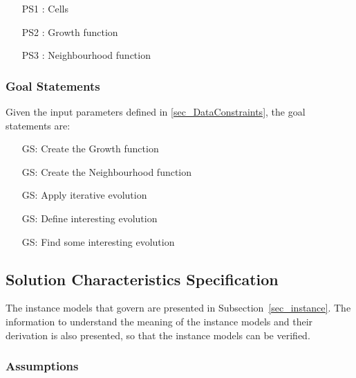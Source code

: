 \documentclass[12pt]{article}
\newcounter{goalnum} %
\begin{document}
\begin{itemize}

\item[PS1 :] Cells

\item[PS2 :] Growth function

\item[PS3 :] Neighbourhood function

\end{itemize}

\subsubsection{Goal Statements}

\noindent Given the input parameters defined in \ref{sec_DataConstraints}, the goal statements are:

\begin{itemize}

\item[GS\refstepcounter{goalnum}\thegoalnum \label{G_GFCT}:] Create the Growth function

\item[GS\refstepcounter{goalnum}\thegoalnum \label{G_meaningfulLabel}:] Create the Neighbourhood function

\item[GS\refstepcounter{goalnum}\thegoalnum \label{G_meaningfulLabel}:] Apply iterative evolution

\item[GS\refstepcounter{goalnum}\thegoalnum \label{G_meaningfulLabel}:] Define interesting evolution

\item[GS\refstepcounter{goalnum}\thegoalnum \label{G_meaningfulLabel}:] Find some interesting evolution

\end{itemize}

\subsection{Solution Characteristics Specification}

The instance models that govern \progname{} are presented in
Subsection~\ref{sec_instance}.  The information to understand the meaning of the
instance models and their derivation is also presented, so that the instance
models can be verified.


\subsubsection{Assumptions} \label{sec_assumpt}
\end{document}
